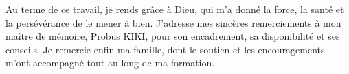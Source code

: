 \remerciements

\begin{nouv}
Au terme de ce travail, je rends grâce à Dieu, qui m'a donné la force, la santé et la persévérance de le mener à bien. J'adresse mes sincères remerciements à mon maître de mémoire, Probus KIKI, pour son encadrement, sa disponibilité et ses conseils. Je remercie enfin ma famille, dont le soutien et les encouragements m'ont accompagné tout au long de ma formation.
\end{nouv}
